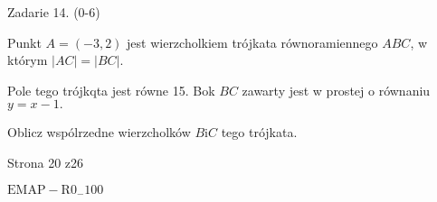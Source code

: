 \documentclass[a4paper,12pt]{article}
\begin{document}
Zadarie 14. (0-6)

Punkt $A=(-3,2)$ jest wierzcholkiem trójkata równoramiennego $ABC$, w którym $|AC|=|BC|.$

Pole tego trójkqta jest równe 15. Bok $BC$ zawarty jest w prostej o równaniu $y=x-1.$

Oblicz wspólrzedne wierzcholków $B \mathrm{i} C$ tego trójkata.

Strona 20 z26

$\mathrm{E}\mathrm{M}\mathrm{A}\mathrm{P}-\mathrm{R}0_{-}100$
\end{document}
